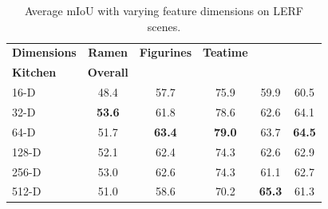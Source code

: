 \begin{table}[t]
    \centering
    \footnotesize
    \begin{tabular}{lccccc}
        \toprule
        \textbf{Dimensions}& 
        \hspace{-2pt}\textbf{Ramen}\hspace{-2pt} & \hspace{-2pt}\textbf{Figurines}\hspace{-2pt} & \hspace{-2pt}\textbf{Teatime}\hspace{-2pt} & \hspace{-2pt}\makecell{\textbf{Waldo}\\\textbf{Kitchen}}\hspace{-2pt} & \hspace{-2pt}\textbf{Overall}\hspace{-2pt} \\
        \midrule
        16-D & 48.4 & 57.7 & 75.9 & 59.9 & 60.5 \\
        32-D & \textbf{53.6} & 61.8 & 78.6 & 62.6 & 64.1 \\
        64-D & 51.7 & \textbf{63.4} & \textbf{79.0} & 63.7 & \textbf{64.5} \\
        128-D & 52.1 & 62.4 & 74.3 & 62.6 & 62.9 \\
        256-D & 53.0 & 62.6 & 74.3 & 61.1 & 62.7 \\
        512-D & 51.0 & 58.6 & 70.2 & \textbf{65.3} & 61.3 \\
        \bottomrule
    \end{tabular}
    \caption{Average mIoU with varying feature dimensions on LERF scenes.}
    \label{tab:lerf-featdim-mIoU}
\end{table}